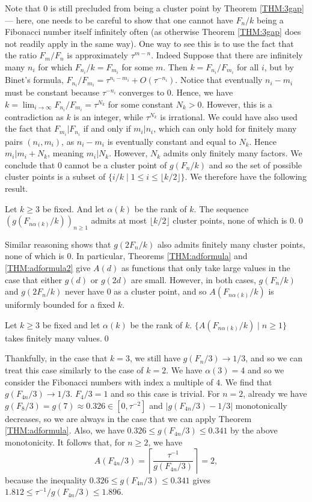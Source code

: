 \documentclass[10pt,a4paper,reqno]{amsart}
\begin{document}
Note that $0$ is still precluded from being a cluster point by Theorem \ref{THM:3gap} --- here, one needs to be careful to show that one cannot have $F_n/k$ being a Fibonacci number itself infinitely often (as otherwise Theorem \ref{THM:3gap} does not readily apply in the same way). One way to see this is to use the fact that
the ratio $F_m/F_n$ is approximately $\tau^{m-n}$. Indeed Suppose that there are infinitely many $n_i$ for which $F_{n_i}/k=F_{m_i}$ for some $m$. Then $k=F_{n_i}/F_{m_i}$ for all $i$, but by Binet's formula, $F_{n_i}/F_{m_i} = \tau^{n_i-m_i}+O(\tau^{-n_i})$. Notice that eventually $n_i-m_i$ must be constant because $\tau^{-n_i}$ converges to 0. Hence, we have $k=\lim_{i \to \infty} F_{n_i}/F_{m_i} = \tau^{N_k}$ for some constant $N_k > 0$. However, this is a contradiction as $k$ is an integer, while $\tau^{N_k}$ is irrational. We could have also used the fact that $F_{m_i}|F_{n_i}$ if and only if $m_i|n_i$, which can only hold for finitely many pairs $(n_i,m_i)$, as $n_i-m_i$ is eventually constant and equal to $N_k$. Hence $m_i|m_i+N_k$, meaning $m_i|N_k$. However, $N_k$ admits only finitely many factors. We conclude that $0$ cannot be a cluster point of $g(F_n/k)$ and so the set of possible cluster points is a subset of $\{i/k \mid 1 \leq i \leq \lfloor k/2\rfloor\}$. We therefore have the following result.

\begin{prop}
Let $k \geq 3$ be fixed. And let $\alpha(k)$ be the rank of $k$. The sequence $(g(F_{n\alpha(k)}/k))_{n \geq 1}$ admits at most $\lfloor k/2\rfloor$ cluster points, none of which is $0$.\qed
\end{prop}

Similar reasoning shows that $g(2F_n/k)$ also admits finitely many cluster points, none of which is $0$. In particular, Theorems \ref{THM:adformula} and \ref{THM:adformula2} give $A(d)$ as functions that only take large values in the case that either $g(d)$ or $g(2d)$ are small. However, in both cases, $g(F_n/k)$ and $g(2F_n/k)$ never have $0$ as a cluster point, and so $A(F_{n\alpha(k)}/k)$ is uniformly bounded for a fixed $k$.

\begin{prop}
Let $k \geq 3$ be fixed and let $\alpha(k)$ be the rank of $k$. $\{A(F_{n\alpha(k)}/k)\mid n \geq 1\}$ takes finitely many values.\qed
\end{prop}

Thankfully, in the case that $k=3$, we still have $g(F_n/3)\to 1/3$, and so we can treat this case similarly to the case of $k=2$. We have $\alpha(3)=4$ and so we consider the Fibonacci numbers with index a multiple of $4$. We find that $g(F_{4n}/3)\to 1/3$. $F_4/3 = 1$ and so this case is trivial. For $n=2$, already we have $g(F_8/3) = g(7)\approx 0.326 \in [0,\tau^{-2}]$ and $|g(F_{4n}/3)-1/3|$ monotonically decreases, so we are always in the case that we can apply Theorem \ref{THM:adformula}. Also, we have $0.326 \leq g(F_{4n}/3) \leq 0.341$ by the above monotonicity. It follows that, for $n \geq 2$, we have
\[
A(F_{4n}/3) = \left\lceil \frac{\tau^{-1}}{g(F_{4n}/3)}\right\rceil = 2,
\]
because the inequality $0.326 \leq g(F_{4n}/3) \leq 0.341$ gives $1.812 \leq \tau^{-1}/g(F_{4n}/3)\leq 1.896$.
\end{document}
